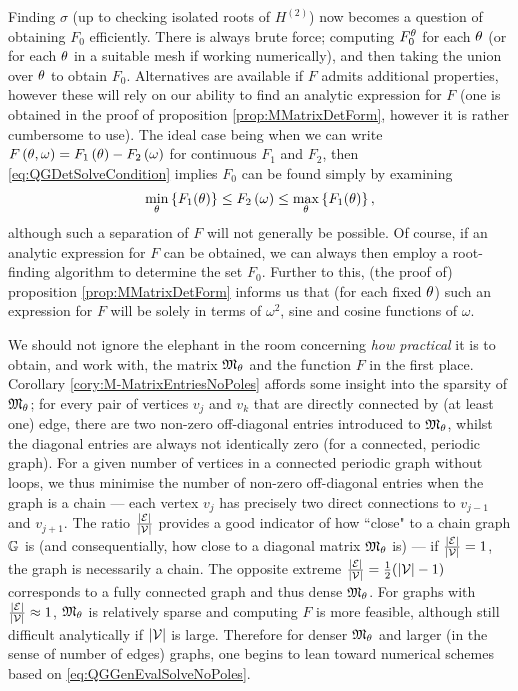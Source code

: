 Finding $\sigma$ (up to checking isolated roots of $H^{(2)}$) now becomes a question of obtaining $F_0$ efficiently.
There is always brute force; computing $F_0^{\theta}$ for each $\theta$ (or for each $\theta$ in a suitable mesh if working numerically), and then taking the union over $\theta$ to obtain $F_0$.
Alternatives are available if $F$ admits additional properties, however these will rely on our ability to find an analytic expression for $F$ (one is obtained in the proof of proposition \ref{prop:MMatrixDetForm}, however it is rather cumbersome to use).
The ideal case being when we can write $F\left( \theta,\omega \right) = F_1\left( \theta \right) - F_2\left( \omega \right)$ for continuous $F_1$ and $F_2$, then \eqref{eq:QGDetSolveCondition} implies $F_0$ can be found simply by examining
\begin{align*}
	\min_{\theta}\left\{ F_1(\theta) \right\} \leq F_2\left( \omega \right) \leq \max_{\theta}\left\{ F_1(\theta) \right\},
\end{align*} 
although such a separation of $F$ will not generally be possible.
Of course, if an analytic expression for $F$ can be obtained, we can always then employ a root-finding algorithm to determine the set $F_0$.
Further to this, (the proof of) proposition \ref{prop:MMatrixDetForm} informs us that (for each fixed $\theta$) such an expression for $F$ will be solely in terms of $\omega^2$, sine and cosine functions of $\omega$.

We should not ignore the elephant in the room concerning \emph{how practical} it is to obtain, and work with, the matrix $\mathfrak{M}_\theta$ and the function $F$ in the first place.
Corollary \ref{cory:M-MatrixEntriesNoPoles} affords some insight into the sparsity of $\mathfrak{M}_{\theta}$; for every pair of vertices $v_j$ and $v_k$ that are directly connected by (at least one) edge, there are two non-zero off-diagonal entries introduced to $\mathfrak{M}_{\theta}$, whilst the diagonal entries are always not identically zero (for a connected, periodic graph).
For a given number of vertices in a connected periodic graph without loops, we thus minimise the number of non-zero off-diagonal entries when the graph is a chain --- each vertex $v_j$ has precisely two direct connections to $v_{j-1}$ and $v_{j+1}$.
The ratio $\frac{\left\lvert \mathcal{E} \right\rvert}{\left\lvert \mathcal{V} \right\rvert}$ provides a good indicator of how ``close" to a chain graph $\mathbb{G}$ is (and consequentially, how close to a diagonal matrix $\mathfrak{M}_\theta$ is) --- if $\frac{\left\lvert \mathcal{E} \right\rvert}{\left\lvert \mathcal{V} \right\rvert} = 1$, the graph is necessarily a chain.
The opposite extreme $\frac{\left\lvert \mathcal{E} \right\rvert}{\left\lvert \mathcal{V} \right\rvert} = \frac{1}{2}(\left\lvert \mathcal{V} \right\rvert-1)$ corresponds to a fully connected graph and thus dense $\mathfrak{M}_\theta$.
For graphs with $\frac{\left\lvert \mathcal{E} \right\rvert}{\left\lvert \mathcal{V} \right\rvert} \approx 1$, $\mathfrak{M}_{\theta}$ is relatively sparse and computing $F$ is more feasible, although still difficult analytically if $\left\lvert \mathcal{V} \right\rvert$ is large.
Therefore for denser $\mathfrak{M}_\theta$ and larger (in the sense of number of edges) graphs, one begins to lean toward numerical schemes based on \eqref{eq:QGGenEvalSolveNoPoles}.

